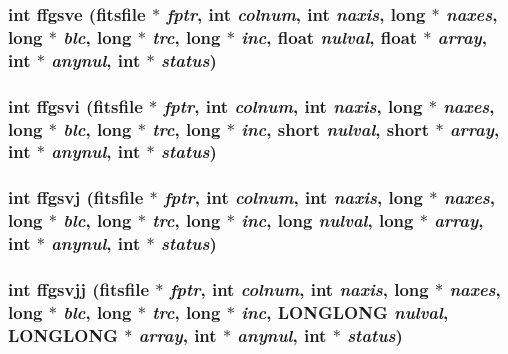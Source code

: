 \subsubsection{\setlength{\rightskip}{0pt plus 5cm}int ffgsve (\bf{fitsfile} $\ast$ {\em fptr}, int {\em colnum}, int {\em naxis}, long $\ast$ {\em naxes}, long $\ast$ {\em blc}, long $\ast$ {\em trc}, long $\ast$ {\em inc}, float {\em nulval}, float $\ast$ {\em array}, int $\ast$ {\em anynul}, int $\ast$ {\em status})}\label{test_2roimasker_2fitsio_8h_caea21eb62f053c04e29d9fe6706e7ee}


\subsubsection{\setlength{\rightskip}{0pt plus 5cm}int ffgsvi (\bf{fitsfile} $\ast$ {\em fptr}, int {\em colnum}, int {\em naxis}, long $\ast$ {\em naxes}, long $\ast$ {\em blc}, long $\ast$ {\em trc}, long $\ast$ {\em inc}, short {\em nulval}, short $\ast$ {\em array}, int $\ast$ {\em anynul}, int $\ast$ {\em status})}\label{test_2roimasker_2fitsio_8h_f6fc8403f2e424f4940ccbb2ef1f13c5}


\subsubsection{\setlength{\rightskip}{0pt plus 5cm}int ffgsvj (\bf{fitsfile} $\ast$ {\em fptr}, int {\em colnum}, int {\em naxis}, long $\ast$ {\em naxes}, long $\ast$ {\em blc}, long $\ast$ {\em trc}, long $\ast$ {\em inc}, long {\em nulval}, long $\ast$ {\em array}, int $\ast$ {\em anynul}, int $\ast$ {\em status})}\label{test_2roimasker_2fitsio_8h_4dab3a6e95489f607d0e69dc0c5b0de2}


\subsubsection{\setlength{\rightskip}{0pt plus 5cm}int ffgsvjj (\bf{fitsfile} $\ast$ {\em fptr}, int {\em colnum}, int {\em naxis}, long $\ast$ {\em naxes}, long $\ast$ {\em blc}, long $\ast$ {\em trc}, long $\ast$ {\em inc}, \bf{LONGLONG} {\em nulval}, \bf{LONGLONG} $\ast$ {\em array}, int $\ast$ {\em anynul}, int $\ast$ {\em status})}\label{test_2roimasker_2fitsio_8h_b11dce310951c2540223e1e021e4257d}


